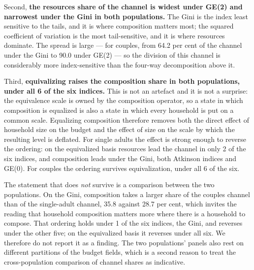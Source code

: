 Second, \textbf{the resources share of the channel is widest under GE(2) and narrowest under the Gini in both populations.} The Gini is the index least sensitive to the tails, and it is where composition matters most; the squared coefficient of variation is the most tail-sensitive, and it is where resources dominate. The spread is large --- for couples, from 64.2 per cent of the channel under the Gini to 90.0 under GE(2) --- so the division of this channel is considerably more index-sensitive than the four-way decomposition above it.

Third, \textbf{equivalizing raises the composition share in both populations, under all 6 of the six indices.} This is not an artefact and it is not a surprise: the equivalence scale is owned by the composition operator, so a state in which composition is equalized is also a state in which every household is put on a common scale. Equalizing composition therefore removes both the direct effect of household size on the budget and the effect of size on the scale by which the resulting level is deflated. For single adults the effect is strong enough to reverse the ordering: on the equivalized basis resources lead the channel in only 2 of the six indices, and composition leads under the Gini, both Atkinson indices and GE(0). For couples the ordering survives equivalization, under all 6 of the six.

The statement that does \emph{not} survive is a comparison between the two populations. On the Gini, composition takes a larger share of the couples channel than of the single-adult channel, 35.8 against 28.7 per cent, which invites the reading that household composition matters more where there is a household to compose. That ordering holds under 1 of the six indices, the Gini, and reverses under the other five; on the equivalized basis it reverses under all six. We therefore do not report it as a finding. The two populations' panels also rest on different partitions of the budget fields, which is a second reason to treat the cross-population comparison of channel shares as indicative.

